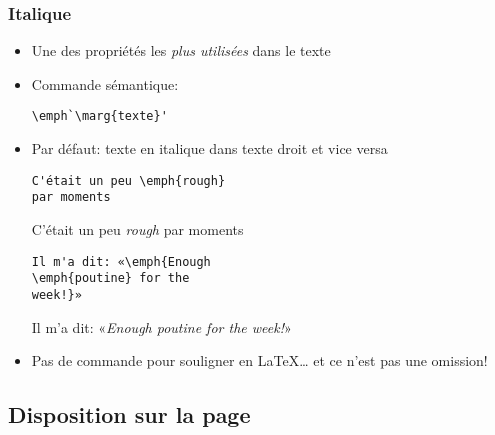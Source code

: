 \begin{frame}[fragile]
  \frametitle{Italique}
  \begin{itemize}
  \item<1-> Une des propriétés les \emph{plus utilisées} dans le texte
    \vfill
  \item<1-> Commande sémantique:
\begin{lstlisting}
\emph`\marg{texte}'
\end{lstlisting}
    \vfill
  \item<2-> Par défaut: texte en italique dans texte droit et vice versa
    \begin{demo}
      \small
      \begin{texample}[0.48\linewidth]
\begin{lstlisting}
C'était un peu \emph{rough}
par moments
\end{lstlisting}
        \producing
        C'était un peu \emph{rough} par moments
      \end{texample}

      \begin{texample}[0.48\linewidth]
\begin{lstlisting}
Il m'a dit: «\emph{Enough
\emph{poutine} for the
week!}»
\end{lstlisting}
        \producing
        Il m'a dit: «\emph{Enough \emph{poutine} for the week!}»
      \end{texample}
    \end{demo}
  \item<3-> Pas de commande pour souligner en {\LaTeX\dots} et ce n'est
    pas une omission!
  \end{itemize}
\end{frame}

\subsection{Disposition sur la page}

